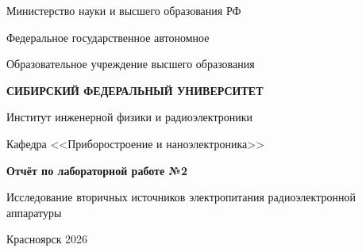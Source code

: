 \begin{center}
    Министерство науки и высшего образования РФ

    Федеральное государственное автономное

    Образовательное учреждение высшего образования

    \textbf{СИБИРСКИЙ ФЕДЕРАЛЬНЫЙ УНИВЕРСИТЕТ}

    Институт инженерной физики и радиоэлектроники

    Кафедра <<Приборостроение и наноэлектроника>>


\vspace{5cm}
\textbf{Отчёт по лабораторной работе №2}

Исследование вторичных источников электропитания
радиоэлектронной аппаратуры

\vspace{5cm}


\vfill
Красноярск 2026

\end{center}
\thispagestyle{empty}
\pagebreak